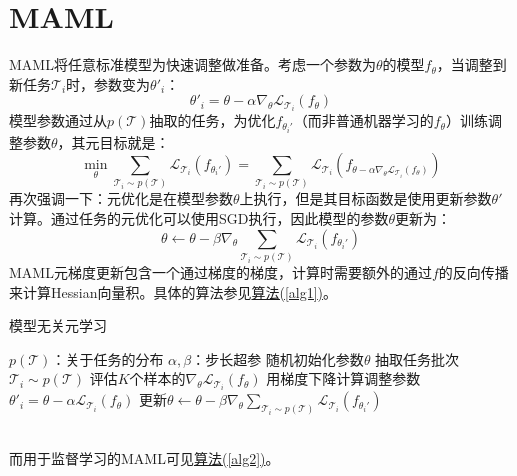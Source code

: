 \documentclass[11pt,twoside,a4paper]{ctexart}
\begin{document}
	\section{MAML}
	MAML将任意标准模型为快速调整做准备。考虑一个参数为$\theta$的模型$f_{\theta}$，当调整到新任务$\mathcal T_i$时，参数变为$\theta'_i$：
	\begin{equation}
		\theta'_i = \theta - \alpha\nabla_\theta\mathcal L_{\mathcal T_i}\left(f_\theta\right)
	\end{equation}
	模型参数通过从$p(\mathcal T)$抽取的任务，为优化$f_{\theta_i'}$（而非普通机器学习的$f_\theta$）训练调整参数$\theta$，其元目标就是：
	\begin{equation}
		\min_\theta\sum_{\mathcal T_i \sim p(\mathcal T)}\mathcal L_{\mathcal T_i}\left(f_{\theta_i'}\right)=\sum_{\mathcal T_i \sim p(\mathcal T)}\mathcal L_{\mathcal T_i}
		\left(f_{\theta - \alpha\nabla_\theta\mathcal L_{\mathcal T_i}\left(f_\theta\right)}\right)
	\end{equation}
	再次强调一下：元优化是在模型参数$\theta$上执行，但是其目标函数是使用更新参数$\theta'$计算。通过任务的元优化可以使用SGD执行，因此模型的参数$\theta$更新为：
	\begin{equation}
		\theta \gets \theta - \beta\nabla_\theta \sum_{\mathcal T_i \sim p(\mathcal T)}\mathcal L_{\mathcal T_i}\left(f_{\theta_i'}\right)
	\end{equation}
	MAML元梯度更新包含一个通过梯度的梯度，计算时需要额外的通过$f$的反向传播来计算Hessian向量积。具体的算法参见\hyperref[alg1]{算法(\ref{alg1})}。
	\begin{algorithm}
		\caption{模型无关元学习}
		\label{alg1}
		\begin{algorithmic}[1]
			\Require $p(\mathcal T)$：关于任务的分布
			\Require $\alpha,\beta$：步长超参
			\State 随机初始化参数$\theta$
			\State 抽取任务批次$\mathcal T_i \sim p(\mathcal T)$
			\State 评估$K$个样本的$\nabla_\theta\mathcal L_{\mathcal T_i}\left( f_\theta \right)$
			\State 用梯度下降计算调整参数$\theta'_i=\theta-\alpha\mathcal{L}_{\mathcal{T}_i}\left( f_\theta \right)$
			\EndFor
			\State 更新$\theta \gets \theta - \beta\nabla_\theta\sum_{\mathcal{T}_i\sim p(\mathcal{T})}\mathcal{L}_{\mathcal{T}_i}\left( f_{\theta_i'}\right)$
			\EndWhile
		\end{algorithmic}
	\end{algorithm}
	\\而用于监督学习的MAML可见\hyperref[alg2]{算法(\ref{alg2})}。
\end{document}
